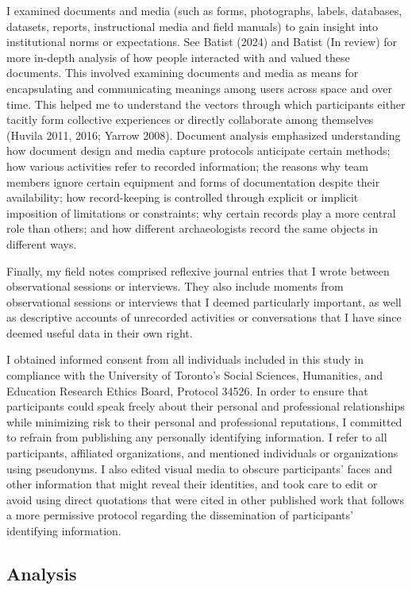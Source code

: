 \documentclass[
]{article}
\begin{document}
I examined documents and media (such as forms, photographs, labels,
databases, datasets, reports, instructional media and field manuals) to
gain insight into institutional norms or expectations. See Batist (2024)
and Batist (In review) for more in-depth analysis of how people
interacted with and valued these documents. This involved examining
documents and media as means for encapsulating and communicating
meanings among users across space and over time. This helped me to
understand the vectors through which participants either tacitly form
collective experiences or directly collaborate among themselves (Huvila
2011, 2016; Yarrow 2008). Document analysis emphasized understanding how
document design and media capture protocols anticipate certain methods;
how various activities refer to recorded information; the reasons why
team members ignore certain equipment and forms of documentation despite
their availability; how record-keeping is controlled through explicit or
implicit imposition of limitations or constraints; why certain records
play a more central role than others; and how different archaeologists
record the same objects in different ways.

Finally, my field notes comprised reflexive journal entries that I wrote
between observational sessions or interviews. They also include moments
from observational sessions or interviews that I deemed particularly
important, as well as descriptive accounts of unrecorded activities or
conversations that I have since deemed useful data in their own right.

I obtained informed consent from all individuals included in this study
in compliance with the University of Toronto's Social Sciences,
Humanities, and Education Research Ethics Board, Protocol 34526. In
order to ensure that participants could speak freely about their
personal and professional relationships while minimizing risk to their
personal and professional reputations, I committed to refrain from
publishing any personally identifying information. I refer to all
participants, affiliated organizations, and mentioned individuals or
organizations using pseudonyms. I also edited visual media to obscure
participants' faces and other information that might reveal their
identities, and took care to edit or avoid using direct quotations that
were cited in other published work that follows a more permissive
protocol regarding the dissemination of participants' identifying
information.

\subsection{Analysis}\label{analysis}
\end{document}
